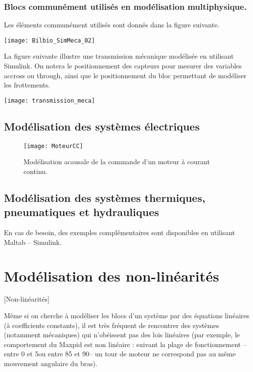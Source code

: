 \subsubsection{Blocs communément utilisés en modélisation multiphysique.}
Les éléments communément utilisés sont donnés dans la figure suivante. 

\begin{figure*}[!h]
\texttt{[image: Bilbio\_SimMeca\_02]}
\end{figure*}

La figure suivante illustre une transmission mécanique modélisée en utilisant Simulink. On notera le positionnement des capteurs pour mesurer des variables accross ou through, ainsi que le positionnement du bloc permettant de modéliser les frottements.

\begin{center}
\texttt{[image: transmission\_meca]}
\end{center}

\subsection{Modélisation des systèmes électriques}

\begin{figure}[!h]
\texttt{[image: MoteurCC]}

\caption{Modélisation acausale de la commande d'un moteur à courant continu.}
\end{figure}


\subsection{Modélisation des systèmes thermiques, pneumatiques et hydrauliques}
En cas de besoin, des exemples complémentaires sont disponibles en utilisant Maltab -- Simulink.


\section{Modélisation des non-linéarités}[Non-linéarités]

Même si on cherche à modéliser les blocs d'un système par des équations linéaires (à coefficients constants), il est très fréquent de rencontrer des systèmes (notamment mécaniques) qui n'obéissent pas des lois linéaires (par exemple, le comportement du Maxpid est non linéaire : suivant la plage de fonctionnement -- entre 0 et 5\textdegree ou entre 85 et 90\textdegree -- un tour de moteur ne correspond pas au même mouvement angulaire du bras). 

